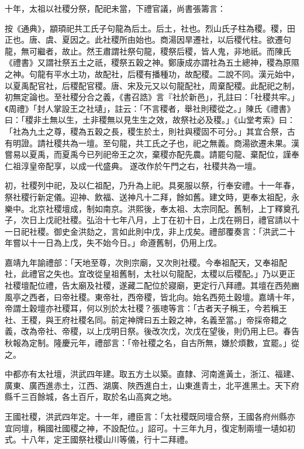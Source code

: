十年，太祖以社稷分祭，配祀未當，下禮官議，尚書張籌言：

按《通典》，顓頊祀共工氏子句龍為后土。后土，社也。烈山氏子柱為稷。稷，田正也。唐、虞、夏因之。此社稷所由始也。商湯因旱遷社，以后稷代柱。欲遷句龍，無可繼者，故止。然王肅謂社祭句龍，稷祭后稷，皆人鬼，非地祇。而陳氏《禮書》又謂社祭五土之祇，稷祭五穀之神。鄭康成亦謂社為五土總神，稷為原隰之神。句龍有平水土功，故配社，后稷有播種功，故配稷。二說不同。漢元始中，以夏禹配官社，后稷配官稷。唐、宋及元又以句龍配社，周棄配稷。此配祀之制，初無定論也。至社稷分合之義，《書召誥》言『社於新邑」，孔註曰：「社稷共牢。」《周禮》「封人掌設王之社壝」，註云：「不言稷者，舉社則稷從之。」陳氏《禮書》曰：「稷非土無以生，土非稷無以見生生之效，故祭社必及稷。」《山堂考索》曰：「社為九土之尊，稷為五穀之長，稷生於土，則社與稷固不可分。」其宜合祭，古有明證。請社稷共為一壇。至句龍，共工氏之子也，祀之無義。商湯欲遷未果。漢嘗易以夏禹，而夏禹今已列祀帝王之次，棄稷亦配先農。請罷句龍、棄配位，謹奉仁祖淳皇帝配享，以成一代盛典。遂改作於午門之右，社稷共為一壇。

初，社稷列中祀，及以仁祖配，乃升為上祀。具冕服以祭，行奉安禮。十一年春，祭社稷行新定儀。迎神、飲福、送神凡十二拜，餘如舊。建文時，更奉太祖配，永樂中。北京社稷壇成，制如南京。洪熙後，奉太祖、太宗同配。舊制，上丁釋奠孔子，次日上戊祀社稷。弘治十七年八月，上丁在初十日，上戊在朔日，禮官請以十一日祀社稷。御史金洪劾之，言如此則中戊，非上戊矣。禮部覆奏言：「洪武二十年嘗以十一日為上戊，失不始今日。」命遵舊制，仍用上戊。

嘉靖九年諭禮部：「天地至尊，次則宗廟，又次則社稷。今奉祖配天，又奉祖配社，此禮官之失也。宜改從皇祖舊制，太社以句龍配，太稷以后稷配。」乃以更正社稷壇配位禮，告太廟及社稷，遂藏二配位於寢廟，更定行八拜禮。其壇在西苑豳風亭之西者，曰帝社稷。東帝社，西帝稷，皆北向。始名西苑土穀壇。嘉靖十年，帝謂土穀壇亦社稷耳，何以別於太社稷？張璁等言：「古者天子稱王，今若稱王社、王稷，與王府社稷名同。前定神牌曰五土穀之神，名義至當。」帝採帝耤之義，改為帝社、帝稷，以上戊明日祭。後改次戊，次戊在望後，則仍用上巳。春告秋報為定制。隆慶元年，禮部言：「帝社稷之名，自古所無，嫌於煩數，宜罷。」從之。

中都亦有太社壇，洪武四年建。取五方土以築。直隸、河南進黃土，浙江、福建、廣東、廣西進赤土，江西、湖廣、陜西進白土，山東進青土，北平進黑土。天下府縣千三百餘城，各土百斤，取於名山高爽之地。

王國社稷，洪武四年定。十一年，禮臣言：「太社稷既同壇合祭，王國各府州縣亦宜同壇，稱國社國稷之神，不設配位。」詔可。十三年九月，復定制兩壇一壝如初式。十八年，定王國祭社稷山川等儀，行十二拜禮。

